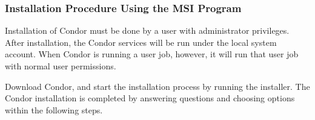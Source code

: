 \subsubsection{\label{sec:nt-install-procedure}
Installation Procedure Using the MSI Program}

% 

Installation of Condor must be done by a user with administrator privileges.
After installation, the Condor services will be run under 
the local system account.
When Condor is running a user job, however, 
it will run that user job with normal user permissions.

Download Condor, and start the installation process by running the installer. 
The Condor installation is completed by answering questions 
and choosing options within the following steps.

